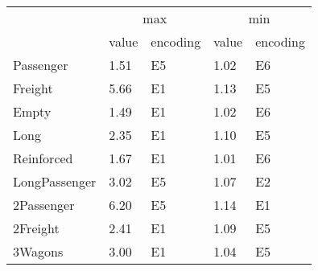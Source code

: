 \begin{tabular}{lllll}
\toprule
 & \multicolumn{2}{c}{max} & \multicolumn{2}{c}{min} \\
 & value & encoding & value & encoding \\
\midrule
Passenger & 1.51 & E5 & 1.02 & E6 \\
Freight & 5.66 & E1 & 1.13 & E5 \\
Empty & 1.49 & E1 & 1.02 & E6 \\
Long & 2.35 & E1 & 1.10 & E5 \\
Reinforced & 1.67 & E1 & 1.01 & E6 \\
LongPassenger & 3.02 & E5 & 1.07 & E2 \\
2Passenger & 6.20 & E5 & 1.14 & E1 \\
2Freight & 2.41 & E1 & 1.09 & E5 \\
3Wagons & 3.00 & E1 & 1.04 & E5 \\
\bottomrule
\end{tabular}
